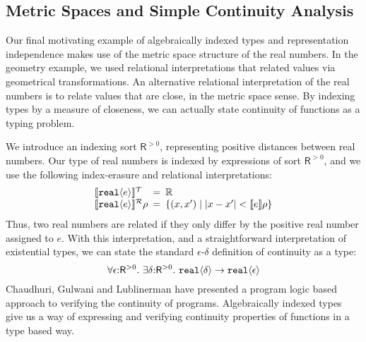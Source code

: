 
\subsection{Metric Spaces and Simple Continuity Analysis}
\label{sec:continuity-analysis}

Our final motivating example of algebraically indexed types and
representation independence makes use of the metric space structure of
the real numbers. In the geometry example, we used relational
interpretations that related values via geometrical
transformations. An alternative relational interpretation of the real
numbers is to relate values that are close, in the metric space
sense. By indexing types by a measure of closeness, we can actually
state continuity of functions as a typing problem.

We introduce an indexing sort $\mathsf{R}^{>0}$, representing positive
distances between real numbers. Our type of real numbers is indexed by
expressions of sort $\mathsf{R}^{>0}$, and we use the following
index-erasure and relational interpretations:
\begin{displaymath}
  \begin{array}{l@{\hspace{0.5em}=\hspace{0.5em}}l}
    \tySem{\tyPrim{real}{e}} & \mathbb{R} \\
    \rsem{\tyPrim{real}{e}}{}\rho & \{ (x,x') \sepbar |x-x'| < \sem{e}\rho \}
  \end{array}
\end{displaymath}
Thus, two real numbers are related if they only differ by the positive
real number assigned to $e$. With this interpretation, and a
straightforward interpretation of existential types, we can state the
standard $\epsilon$-$\delta$ definition of continuity as a type:
\begin{displaymath}
  \forall \epsilon \mathord: \mathsf{R}^{>0}.\ \exists \delta\mathord: \mathsf{R}^{>0}.\ \textup{\texttt{real}}\langle \delta \rangle \to \textup{\texttt{real}}\langle \epsilon \rangle
\end{displaymath}
Chaudhuri, Gulwani and Lublinerman \cite{chaudhuri10continuity} have
presented a program logic based approach to verifying the continuity
of programs. Algebraically indexed types give us a way of expressing
and verifying continuity properties of functions in a type based way.

